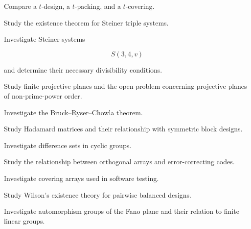 \begin{exercise}[3]
Compare a \(t\)-design, a \(t\)-packing, and a \(t\)-covering.
\end{exercise}

\begin{exercise}[4]
Study the existence theorem for Steiner triple systems.
\end{exercise}

\begin{exercise}[4]
Investigate Steiner systems

\[
S(3,4,v)
\]

and determine their necessary divisibility conditions.
\end{exercise}

\begin{exercise}[4]
Study finite projective planes and the open problem concerning projective
planes of non-prime-power order.
\end{exercise}

\begin{exercise}[4]
Investigate the Bruck--Ryser--Chowla theorem.
\end{exercise}

\begin{exercise}[4]
Study Hadamard matrices and their relationship with symmetric block
designs.
\end{exercise}

\begin{exercise}[4]
Investigate difference sets in cyclic groups.
\end{exercise}

\begin{exercise}[4]
Study the relationship between orthogonal arrays and error-correcting
codes.
\end{exercise}

\begin{exercise}[4]
Investigate covering arrays used in software testing.
\end{exercise}

\begin{exercise}[4]
Study Wilson's existence theory for pairwise balanced designs.
\end{exercise}

\begin{exercise}[4]
Investigate automorphism groups of the Fano plane and their relation to
finite linear groups.
\end{exercise}

